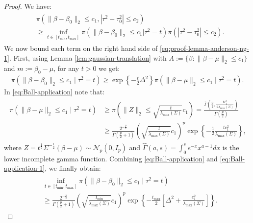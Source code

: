 \documentclass[12pt]{article}
\numberwithin{equation}{section}
\begin{document}
\begin{proof}
We have:
%
\begin{align}\label{eq:proof-lemma-anderson-ng-1}
    \begin{split}
        &\pi\left(\lVert \beta-\beta_0\rVert_2 \leq c_1, |\tau^2-\tau^2_0| \leq c_2\right)\\
        &\geq \inf_{t\in [t_{\min}, t_{\max}]}\pi\left(\lVert \beta-\beta_0\rVert_{2}\leq c_1 \Big|\tau^{2}=t\right)
        \pi\left(|\tau^2-\tau_0^2| \leq c_2\right).
    \end{split}
\end{align}
%
We now bound each term on the right hand side of \eqref{eq:proof-lemma-anderson-ng-1}. First, using Lemma \ref{lem:gaussian-translation} with $A := \{\beta: \lVert \beta-\mu\rVert_2 \leq c_1\}$ and $m := \beta_0-\mu$, for any $t > 0$ we get:
\begin{align}\label{eq:Ball-application}
    \pi\left(\lVert \beta-\beta_0\rVert_2 \leq c_1\mid \tau^2=t\right) \geq \exp\left\{-\frac{t}{2}\Delta^2\right\}\pi\left(\lVert \beta-\mu\rVert_2\leq c_1\mid \tau^2=t\right).
\end{align}
In \eqref{eq:Ball-application} note that:
\begin{align}\label{eq:Ball-application-1}
\begin{split}
    \pi\left(\lVert \beta-\mu\rVert_2\leq c_1\mid \tau^2=t\right) &\geq \pi\left(\lVert Z\rVert_2 \leq \sqrt{\frac{t}{\lambda_{\mathrm{max}}(\Sigma)}} c_1\right)
    = \frac{\widehat{\Gamma}\left(\frac{p}{2}, \frac{t c_1^2}{2\lambda_{\mathrm{max}}(\Sigma)}\right)}{\Gamma\left(\frac{p}{2}\right)}\\
    &\geq \frac{2^{-\frac{p}{2}}}{\Gamma\left(\frac{p}{2}+1\right)} \left(\sqrt{\frac{t}{\lambda_{\mathrm{max}}(\Sigma)}}c_1\right)^{p}\exp\left\{-\frac{1}{2}\frac{t c_1^2}{\lambda_{\mathrm{max}}(\Sigma)}\right\},
\end{split}
\end{align}
%
where $Z = t^{\frac{1}{2}}\Sigma^{-\frac{1}{2}}(\beta-\mu) \sim \mathcal{N}_p(0, I_p)$ and $\widehat{\Gamma}(a,s) = \int_{0}^{s} e^{-x}x^{a-1}dx$ is the lower incomplete gamma function. Combining \eqref{eq:Ball-application} and \eqref{eq:Ball-application-1}, we finally obtain:
%
\begin{align}\label{eq:Ball-application-2}
    \begin{split}
        &\inf_{t \in [t_{\min}, t_{\max}]}\pi\left(\lVert \beta-\beta_0\rVert_2\leq c_1\mid \tau^2=t\right) \\
        &\geq \frac{2^{-\frac{p}{2}}}{\Gamma\left(\frac{p}{2}+1\right)}\left(\sqrt{\frac{t_{\min}}{\lambda_{\mathrm{max}}(\Sigma)}}c_1\right)^{p}\exp\left\{-\frac{t_{\max}}{2}\left[\Delta^2 + \frac{c_1^2}{\lambda_{\mathrm{max}}(\Sigma)}\right]\right\}.
    \end{split}
\end{align}


\end{proof}
\end{document}
